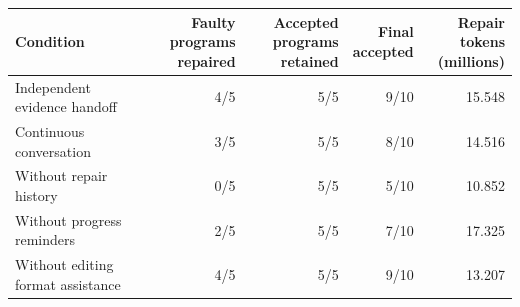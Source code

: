 \begin{tabular*}{\linewidth}{@{\extracolsep{\fill}}lrrrr@{}}
\toprule
\textbf{Condition} & \thead{Faulty\\programs repaired} & \thead{Accepted programs\\retained} & \thead{Final\\accepted} & \thead{Repair tokens\\(millions)} \\
\midrule
Independent evidence handoff & 4/5 & 5/5 & 9/10 & 15.548 \\
Continuous conversation & 3/5 & 5/5 & 8/10 & 14.516 \\
Without repair history & 0/5 & 5/5 & 5/10 & 10.852 \\
Without progress reminders & 2/5 & 5/5 & 7/10 & 17.325 \\
Without editing format assistance & 4/5 & 5/5 & 9/10 & 13.207 \\
\bottomrule
\end{tabular*}
